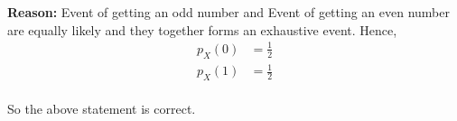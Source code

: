 \documentclass[journal,12pt,twocolumn]{IEEEtran}
\begin{document}
\begin{enumerate}
\begin{table}[htbp]


\end{table}

\textbf{Reason:} Event of getting an odd number and Event of getting an even number are equally likely and they together forms an exhaustive event.
Hence,
\begin{align}
	p_X(0) &= \frac{1}{2}\\
	p_X(1) &= \frac{1}{2}
\end{align}
\\So the above statement is correct.
\end{enumerate}
\end{document}
